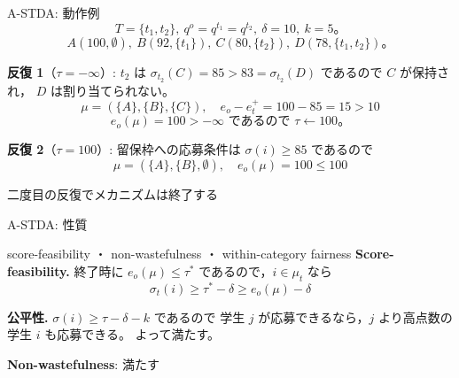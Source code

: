 \documentclass[aspectratio=43,11pt]{beamer}
\newcommand{\muc}[1]{\mu_{#1}}
\newcommand{\eo}{e_o}
\newcommand{\et}{e_t^{+}}
\newcommand{\score}{\sigma}
\begin{document}
\begin{frame}{A-STDA: 動作例}
  \[
    T = \{t_1, t_2\},\ q^{o} = q^{t_1} = q^{t_2},\ \delta = 10,\ k = 5\text{。}
  \]
  \[
    A(100, \emptyset),\ B(92, \{t_1\}),\ C(80, \{t_2\}),\ D(78, \{t_1, t_2\})\text{。}
  \]

  \textbf{反復 1}（$\tau = -\infty$）: $t_2$ は
  $\score_{t_2}(C) = 85 > 83 = \score_{t_2}(D)$ であるので $C$ が保持され，
  $D$ は割り当てられない。
  \[
    \mu = (\{A\}, \{B\}, \{C\}), \quad
    \eo - \et = 100 - 85 = 15 > 10
  \]
  \[
    \eo(\mu) = 100 > -\infty \text{ であるので } \tau \leftarrow 100\text{。}
  \]

  \textbf{反復 2}（$\tau = 100$）: 留保枠への応募条件は
  $\score(i) \ge 85$ であるので
  \[
    \mu = (\{A\}, \{B\}, \emptyset), \quad \eo(\mu) = 100 \le 100
  \]

  二度目の反復でメカニズムは終了する
\end{frame}

\begin{frame}{A-STDA: 性質}
  \begin{block}{score-feasibility ・ non-wastefulness ・ within-category fairness}
    \textbf{Score-feasibility.}
    終了時に $\eo(\mu) \le \tau^{*}$ であるので，$i \in \muc{t}$ なら
    \[
      \score_t(i) \ge \tau^{*} - \delta \ge \eo(\mu) - \delta
    \]

    \textbf{公平性.} $\score(i) \ge \tau - \delta - k$ であるので
    学生 $j$ が応募できるなら，$j$ より高点数の学生 $i$ も応募できる。
    よって満たす。

    \vspace{0.5em}
    \textbf{Non-wastefulness}: 満たす
  \end{block}
\end{frame}
\end{document}
